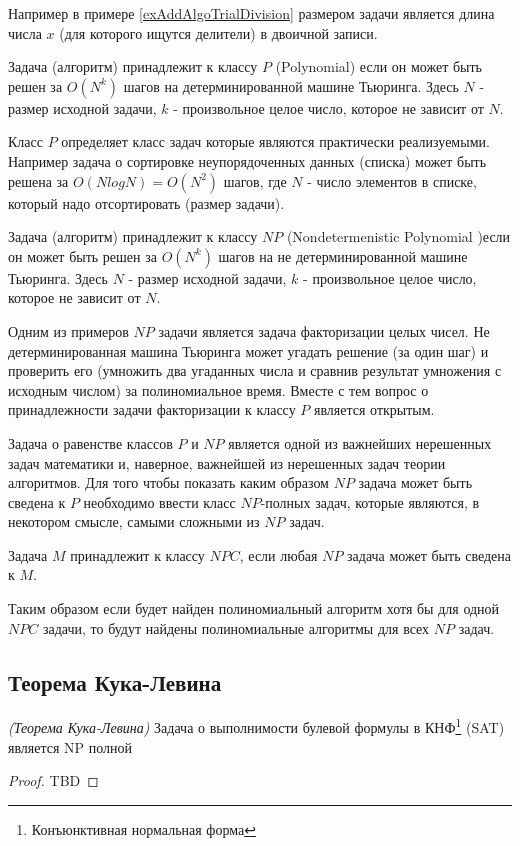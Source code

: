 Например в примере \ref{exAddAlgoTrialDivision} размером задачи
является длина числа $x$ (для которого ищутся делители) в двоичной
записи. 

\begin{definition}[Класс $P$]
Задача (алгоритм) принадлежит к классу $P$ (Polynomial) если он может
быть решен за 
 $O\left(N^k\right)$ шагов на детерминированной машине Тьюринга.
Здесь $N$ - размер исходной задачи, $k$ - произвольное целое число,
которое не зависит от $N$.  
\end{definition}

Класс $P$ определяет класс задач которые являются практически
реализуемыми. Например задача о сортировке неупорядоченных данных
(списка) может быть решена за 
$O\left(N log N \right) = O\left(N^2\right)$ шагов, где $N$ - число
элементов в списке, который надо отсортировать (размер задачи).

\begin{definition}[Класс $NP$]
Задача (алгоритм) принадлежит к классу $NP$ (Nondetermenistic Polynomial )если
он может быть решен за  $O\left(N^k\right)$ шагов на
не детерминированной машине Тьюринга.  Здесь $N$ - размер исходной
задачи, $k$ - произвольное целое число, которое не зависит от $N$. 
\end{definition}

Одним из примеров $NP$ задачи является задача факторизации целых
чисел. Не детерминированная машина Тьюринга может угадать решение (за
один шаг) и проверить его (умножить два угаданных числа и сравнив
результат умножения с исходным числом) за полиномиальное время. Вместе
с тем вопрос о принадлежности задачи факторизации к классу $P$
является открытым. 

Задача о равенстве классов $P$ и $NP$ является одной из важнейших
нерешенных задач математики и, наверное, важнейшей из нерешенных задач
теории алгоритмов. Для того чтобы показать каким образом $NP$ задача
может быть сведена к  $P$ необходимо ввести класс $NP$-полных задач,
которые являются, в некотором смысле, самыми сложными из $NP$ задач. 

\begin{definition}
Задача $M$ принадлежит к классу $NPC$, если любая $NP$ задача
может быть сведена к $M$.
\end{definition}

Таким образом если будет найден полиномиальный алгоритм хотя бы для
одной $NPC$ задачи, то будут найдены полиномиальные алгоритмы
для всех $NP$ задач. 
 

\subsection{Теорема Кука-Левина}

\begin{theorem}
\emph{(Теорема Кука-Левина)}
Задача о выполнимости булевой формулы в КНФ\footnote{Конъюнктивная нормальная форма} (SAT) является NP полной
\label{theoremAddAlgoCookTheorem}
\end{theorem}

\begin{proof}
TBD
\end{proof}
